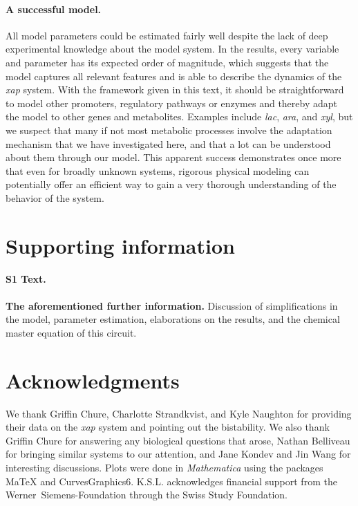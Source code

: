 \documentclass[10pt,letterpaper]{article}
\begin{document}
\paragraph*{A successful model.}
All model parameters could be estimated fairly well despite the lack of deep
experimental knowledge about the model system. In the results, every
variable and parameter has its expected order of magnitude, which suggests
that the model captures all relevant features and is able to describe the
dynamics of the \emph{xap} system. With the framework given in this text, it
should be straightforward to model other promoters, regulatory pathways or
enzymes and thereby adapt the model to other genes and metabolites. Examples
include \emph{lac}, \emph{ara}, and \emph{xyl}, but we suspect that many if
not most metabolic processes involve the adaptation mechanism that we have
investigated here, and that a lot can be understood about them through our
model. This apparent success demonstrates once more that even for broadly
unknown systems, rigorous physical modeling can potentially offer an
efficient way to gain a very thorough understanding of the behavior of the
system. 



\section*{Supporting information}
\paragraph*{S1 Text.}
\label{S1_Text}
{\bf The aforementioned further information.} Discussion of simplifications
in the model, parameter estimation, elaborations on the results, and the
chemical master equation of this circuit.

\section*{Acknowledgments}
We thank Griffin Chure, Charlotte Strandkvist, and Kyle Naughton for
providing their data on the \emph{xap} system and pointing out the
bistability. We also thank Griffin Chure for answering any biological
questions that arose, Nathan Belliveau for bringing similar systems to our
attention, and Jane Kondev and Jin Wang for interesting discussions. Plots
were done in \emph{Mathematica} using the packages MaTeX and
CurvesGraphics6. K.S.L. acknowledges financial support from the
Werner~Siemens-Foundation through the Swiss Study Foundation.
\end{document}
